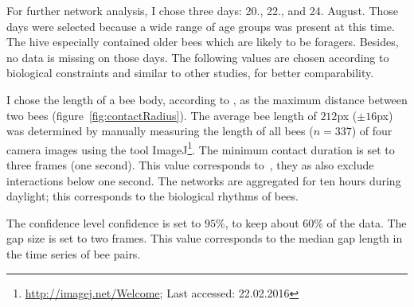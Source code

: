 For further network analysis, I chose three days: 20., 22., and 24. August.
Those days were selected because a wide range of age groups was present at this time. The hive especially contained older bees which are likely to be foragers. Besides, no data is missing on those days.
The following values are chosen according to biological constraints and similar to other studies, for better comparability.

I chose the length of a bee body, according to \textcite{baracchi2014socio}, as the maximum distance between two bees (figure~\ref{fig:contactRadius}). The average bee length of $212$px ($\pm 16$px)  was determined by manually measuring the length of all bees ($n=337$) of four camera images using the tool ImageJ\footnote{\url{http://imagej.net/Welcome}; Last accessed:
 22.02.2016}.
The minimum contact duration is set to three frames (one second). This value corresponds to~\textcite{mersch2013tracking}, they as also exclude interactions below one second.
The networks are aggregated for ten hours during daylight; this corresponds to the biological rhythms of bees.

The confidence level confidence is set to $95\%$, to keep about 60\% of the data.
The gap size is set to two frames. This value corresponds to the median gap length in the time series of bee pairs.

